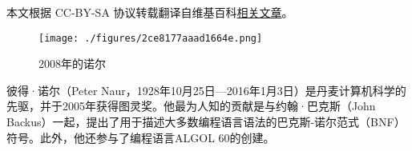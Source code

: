 
本文根据 CC-BY-SA 协议转载翻译自维基百科\href{https://en.wikipedia.org/wiki/Peter_Naur}{相关文章}。

\begin{figure}[ht]
\centering
\texttt{[image: ./figures/2ce8177aaad1664e.png]}
\caption{2008年的诺尔} \label{fig_BDNR_1}
\end{figure}
彼得·诺尔（Peter Naur，1928年10月25日—2016年1月3日）是丹麦计算机科学的先驱，并于2005年获得图灵奖。他最为人知的贡献是与约翰·巴克斯（John Backus）一起，提出了用于描述大多数编程语言语法的巴克斯-诺尔范式（BNF）符号。此外，他还参与了编程语言ALGOL 60的创建。